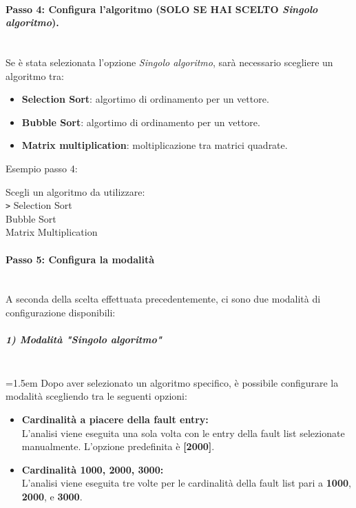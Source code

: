 \documentclass{article}
\begin{document}
\paragraph{Passo 4: Configura l'algoritmo (SOLO SE HAI SCELTO \textit{Singolo algoritmo}).}\leavevmode\\
Se è stata selezionata l'opzione \textit{Singolo algoritmo}, sarà necessario scegliere un algoritmo tra:
\begin{itemize}
    \item \textbf{Selection Sort}: algortimo di ordinamento per un vettore.
    \item \textbf{Bubble Sort}: algortimo di ordinamento per un vettore.
    \item \textbf{Matrix multiplication}: moltiplicazione tra matrici quadrate.  
\end{itemize}
Esempio passo 4:
\begin{tcolorbox}[colback=black, coltext=white, sharp corners, boxrule=0.5mm, width=\textwidth]
    Scegli un algoritmo da utilizzare: \\
    \texttt{>} Selection Sort \\
    \hspace{2.5em}Bubble Sort \\
    \hspace{2.5em}Matrix Multiplication
\end{tcolorbox}


\paragraph{Passo 5: Configura la modalità}\leavevmode\\
A seconda della scelta effettuata precedentemente, ci sono due modalità di configurazione disponibili:

\subparagraph{1) Modalità "Singolo algoritmo"}\leavevmode\\
\hangindent=1.5em   
Dopo aver selezionato un algoritmo specifico, è possibile configurare la modalità scegliendo tra le seguenti opzioni:
\begin{itemize}
    \item \textbf{Cardinalità a piacere della fault entry:}\\
    L'analisi viene eseguita una sola volta con le entry della fault list selezionate manualmente. L'opzione predefinita è \textbf{[2000]}.
    \item \textbf{Cardinalità 1000, 2000, 3000:}\\
    L'analisi viene eseguita tre volte per le cardinalità della fault list pari a \textbf{1000}, \textbf{2000}, e \textbf{3000}.
\end{itemize}
\end{document}
